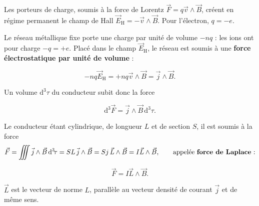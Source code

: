 \documentclass[11pt,a4paper]{article}
\newcommand{\dd}{\mathrm d}
\newcommand{\vv}{\vec v}
\newcommand{\stars}[1]{\mathord{\star}\ifnum#1>1\mkern5mu\mathord{\star}\fi\ifnum#1>2\mkern5mu\mathord{\star}\fi\ifnum#1>3\mkern5mu\mathord{\star}\fi\ifnum#1>4\mkern5mu\mathord{\star}\fi\ifnum#1>5\mkern5mu\mathord{\star}\fi}
\newenvironment{result}[1][4]{\begin{cadre}[etoiles={\stars{#1}}]}{\end{cadre}}
\newcommand{\vj}{\vec j}\newcommand{\vE}{\vec E}\newcommand{\vB}{\vec B}
\newcommand{\vol}{\dd^3\!\tau}
\newcommand{\EH}{\vec E_{\mathrm H}}
\newcommand{\bmath}[1]{\begin{cadre}\[#1\]\end{cadre}}
\newcommand{\betoile}[2]{\begin{result}[#1]\[#2\]\end{result}}
\begin{document}
Les porteurs de charge, soumis à la force de Lorentz \(\vec F=q\vv\wedge\vB\), créent en
régime permanent le champ de Hall \(\EH=-\vv\wedge\vB\). Pour l'électron, \(q=-e\).

Le réseau métallique fixe porte une charge par unité de volume \(-nq\) : les ions ont pour charge
\(-q=+e\). Placé dans le champ \(\EH\), le réseau est soumis à une \textbf{force électrostatique
par unité de volume} :
\bmath{-nq\EH=+nq\vv\wedge\vB=\vj\wedge\vB.}
Un volume \(\vol\) du conducteur subit donc la force
\betoile{5}{\dd^3\vec F=\vj\wedge\vB\,\vol.}
Le conducteur étant cylindrique, de longueur \(L\) et de section \(S\), il est soumis à la force
\[
 \vec F=\iiint\vj\wedge\vB\,\vol
       =S L\,\vj\wedge\vB=S j\,\vec L\wedge\vB=I\vec L\wedge\vB,
       \qquad \text{appelée \textbf{force de Laplace} :}
\]
\bmath{\vec F=I\vec L\wedge\vB.}
\(\vec L\) est le vecteur de norme \(L\), parallèle au vecteur densité de courant \(\vj\)
et de même sens.
\end{document}

